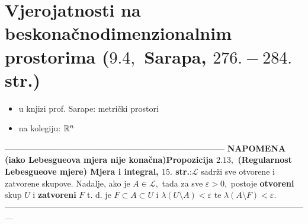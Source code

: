 \documentclass{article}
\begin{document}
\section{Vjerojatnosti na beskonačnodimenzionalnim prostorima (\textsection \(9.4,\) Sarapa, \(276.-284.\) str.)}
\begin{itemize}
    \item[\ding{228}] u knjizi prof. Sarape: metrički prostori
    \item[\ding{228}] na kolegiju: \(\Bbb R^n\)
\end{itemize}
--------------------------------------------------------------------------------\newline\newline
{}\textbf{NAPOMENA (iako Lebesgueova mjera nije konačna)}\newline \textbf{Propozicija \(2.13,\) (Regularnost Lebesgueove mjere) Mjera i integral, \(15.\) str.}:\newline \(\mathcal L\) sadrži sve otvorene i zatvorene skupove. Nadalje, ako je \(A\in\mathcal L,\) tada za sve \(\varepsilon>0,\) postoje \textbf{otvoreni} skup \(U\) i \textbf{zatvoreni} \(F\) t. d. je \(F\subset A\subset U\) i \(\lambda(U\setminus A)<\varepsilon\) te \(\lambda(A\setminus F)<\varepsilon.\)\newline\newline---------------------------------------------------------------------------------------------------------------\newline\newline
\end{document}
